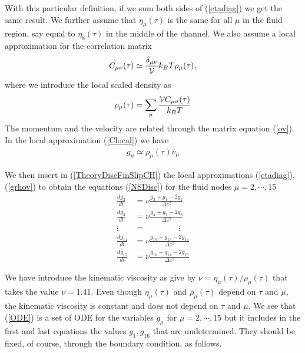 \documentclass[b5paper,openright,10pt]{book}
\begin{document}
With   this  particular   definition,  if   we  sum   both  sides   of
(\ref{etadiag})  we  get the  same  result.   We further  assume  that
$\eta_\mu(\tau)$ is  the same for all  $\mu$ in the fluid  region, say
equal to $\eta_{8}(\tau)$ in the middle of the channel.
We also assume a local approximation for the correlation matrix
\begin{align}
C_{\mu\nu}(\tau)\simeq\frac{\delta_{\mu\nu}}{{\cal    V}}k_BT   \rho_\mu(\tau),
\label{Clocal}
\end{align}
 where we introduce the local scaled density as
\begin{align}
\rho_\mu(\tau)=\sum_\sigma  \frac{{\cal  V}  C_{\mu\sigma}(\tau)}{k_BT  }
\end{align}
The momentum and the velocity  are related through the matrix equation
(\ref{ov}). In the  local approximation (\ref{Clocal}) we have
\begin{align}
  g_\mu\simeq\rho_\mu(\tau)\overline{v}_\mu
\label{grhov}
\end{align}




We  then  insert  in (\ref{TheoryDiscFinSlipCH})  the  local  approximations
(\ref{etadiag}), (\ref{grhov}) to  obtain the equations (\ref{NSDisc})
for the fluid nodes $\mu=2,\cdots,15$
\begin{align}
  \frac{d g_2}{dt}&= \nu\frac{g_3+g_1-2g_2}{\Delta z^2}
\nonumber\\
  \frac{d g_3}{dt}&=\nu\frac{g_4+g_2-2g_3}{\Delta z^2}
\nonumber\\
\vdots\;\;&=\quad\quad\quad\quad\vdots
\nonumber\\
  \frac{d g_{14}}{dt}&=\nu\frac{ g_{15}+ g_{13}-2g_{14}}{\Delta z^2}
\nonumber\\
  \frac{d g_{15}}{dt}&=
\nu\frac{g_{16}+g_{14}-2g_{15}}{\Delta z^2}
\label{ODE}
\end{align}

We have introduce the kinematic viscosity as give by $\nu=\eta_{\mu}(\tau)/\rho_{\mu}(\tau)$ that takes the value $\nu=1.41$. Even though $\eta_{\mu}(\tau)$ and $\rho_{\mu}(\tau)$ depend on $\tau$ and $\mu$, the kinematic viscosity is constant and does not depend on $\tau$ and $\mu$.
We see that 
(\ref{ODE}) is a set of ODE for the variables $g_\mu$ for
$\mu=2,\cdots,15$ but it includes in the first and last equations the
values $g_1,g_{16}$ that are undetermined. They
should be fixed, of course, through the boundary condition, as follows.
\end{document}
